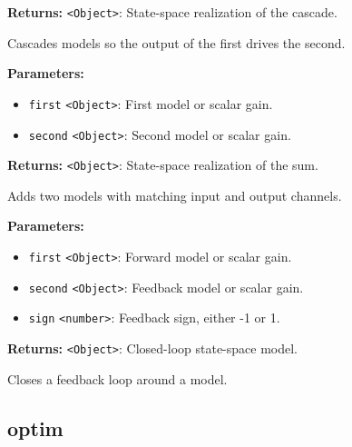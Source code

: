 \documentclass[12pt,a4paper]{article}
\begin{document}
\noindent \textbf{Returns:} \texttt{<Object>}: State-space realization of the cascade.

\noindent Cascades models so the output of the first drives the second.

\vspace{5mm}
\noindent {}


\noindent \textbf{Parameters:}
\begin{itemize}
  \item \texttt{first} \texttt{<Object>}: First model or scalar gain.
  \item \texttt{second} \texttt{<Object>}: Second model or scalar gain.
\end{itemize}

\noindent \textbf{Returns:} \texttt{<Object>}: State-space realization of the sum.

\noindent Adds two models with matching input and output channels.

\vspace{5mm}
\noindent {}


\noindent \textbf{Parameters:}
\begin{itemize}
  \item \texttt{first} \texttt{<Object>}: Forward model or scalar gain.
  \item \texttt{second} \texttt{<Object>}: Feedback model or scalar gain.
  \item \texttt{sign} \texttt{<number>}: Feedback sign, either -1 or 1.
\end{itemize}

\noindent \textbf{Returns:} \texttt{<Object>}: Closed-loop state-space model.

\noindent Closes a feedback loop around a model.


\subsection{optim}
\vspace{5mm}
\noindent {}
\end{document}
